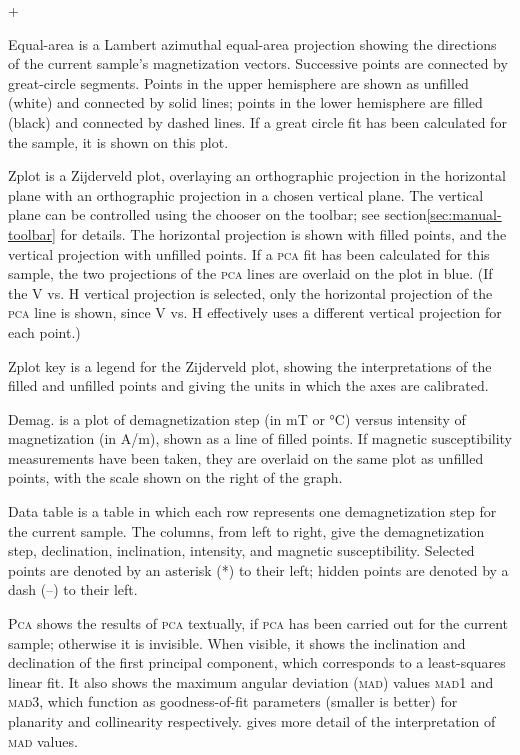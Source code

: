 \documentclass[a4paper]{article}
\newcommand{\menuitemlabel}[1]{%
\mbox{\textsf{#1}}\hfil}
\newenvironment{menuitemlist}%
{\begin{list}{}{%
\renewcommand{\makelabel}{\menuitemlabel}%
\setlength{\labelwidth}{35pt}%
\setlength{\leftmargin}%
             {\labelwidth+\labelsep}}}%
{\end{list}}
\newcommand{\ppcmd}[1]{\textsf{#1}} %
\newcommand{\caps}[1]{\textsc{#1}} %
\begin{document}
\begin{menuitemlist}

\item[Equal-area] is a Lambert azimuthal equal-area projection showing
the directions of the current sample's magnetization vectors. Successive
points are connected by great-circle segments. Points in the upper hemisphere
are shown as unfilled (white) and connected by solid lines; points in the
lower hemisphere are filled (black) and connected by dashed lines. If a great
circle fit has been calculated for the sample, it is shown on this plot.

\item[Zplot] is a Zijderveld plot, overlaying an orthographic projection in
  the horizontal plane with an orthographic projection in a chosen vertical
  plane. The vertical plane can be controlled using the chooser on the
  toolbar; see section\ref{sec:manual-toolbar} for details. The horizontal
  projection is shown with filled points, and the vertical projection with
  unfilled points. If a \caps{pca} fit has been calculated for this sample,
  the two projections of the \caps{pca} lines are overlaid on the plot in
  blue. (If the \ppcmd{V vs. H} vertical projection is selected, only the
  horizontal projection of the \caps{pca} line is shown, since \ppcmd{V vs.
    H} effectively uses a different vertical projection for each point.)

\item[Zplot key] is a legend for the Zijderveld plot, showing
the interpretations of the filled and unfilled points and giving the
units in which the axes are calibrated.

\item[Demag.] is a plot of demagnetization step (in mT or °C) versus
intensity of magnetization (in A/m), shown as a line of filled points.
If magnetic susceptibility measurements have been taken, they are
overlaid on the same plot as unfilled points, with the scale shown on the
right of the graph.

\item[Data table] is a table in which each row represents one
demagnetization step for the current sample. The columns, from left
to right, give the demagnetization step, declination, inclination,
intensity, and magnetic susceptibility. Selected points are denoted
by an asterisk (*) to their left; hidden points are denoted by a
dash (--) to their left.

\item[\caps{Pca}] shows the results of \caps{pca} textually, if
\caps{pca} has been carried out for the current sample; otherwise it is
invisible. When visible, it shows the inclination and declination of the
first principal component, which corresponds to a least-squares linear
fit. It also shows the maximum angular deviation (\caps{mad}) values
\caps{mad}1 and \caps{mad}3, which function as goodness-of-fit parameters
(smaller is better) for planarity and collinearity respectively.
\cite{kirschvink1980least} gives more detail of the interpretation
of \caps{mad} values.


\end{menuitemlist}
\end{document}
